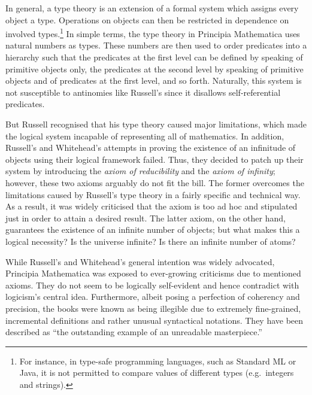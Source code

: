 \documentclass{article}
\begin{document}
In general, a type theory is an extension of a formal system which assigns every object a type. Operations on objects can then be restricted in dependence on involved types.\footnote{For instance, in type-safe programming languages, such as Standard ML or Java, it is not permitted to compare values of different types (e.g.\ integers and strings).} In simple terms, the type theory in Principia Mathematica uses natural numbers as types. These numbers are then used to order predicates into a hierarchy such that the predicates at the first level can be defined by speaking of primitive objects only, the predicates at the second level by speaking of primitive objects and of predicates at the first level, and so forth. Naturally, this system is not susceptible to antinomies like Russell's since it disallows self-referential predicates. 

But Russell recognised that his type theory caused major limitations, which made the logical system incapable of representing all of mathematics. In addition, Russell's and Whitehead's attempts in proving the existence of an infinitude of objects using their logical framework failed. Thus, they decided to patch up their system by introducing the \textit{axiom of reducibility} and the \textit{axiom of infinity}; however, these two axioms arguably do not fit the bill. The former overcomes the limitations caused by Russell's type theory in a fairly specific and technical way. As a result, it was widely criticised that the axiom is too ad hoc and stipulated just in order to attain a desired result.
The latter axiom, on the other hand, guarantees the existence of an infinite number of objects; but what makes this a logical necessity? Is the universe infinite? Is there an infinite number of atoms?

While Russell's and Whitehead's general intention was widely advocated, Principia Mathematica was exposed to ever-growing criticisms due to mentioned axioms. They do not seem to be logically self-evident and hence contradict with logicism's central idea. Furthermore, albeit posing a perfection of coherency and precision, the books were known as being illegible due to extremely fine-grained, incremental definitions and rather unusual syntactical notations. They have been described as ``the outstanding example of an unreadable masterpiece.''\cite[p.~154]{math_experience}
\end{document}
